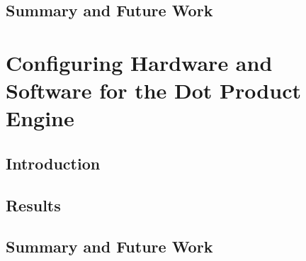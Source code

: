 \subsection{Summary and Future Work}
\label{subsec:FPGAconcl}

\section{Configuring Hardware and Software for the Dot Product Engine}
\label{sec:configDPE}

\subsection{Introduction}
\label{subsec:DPEintro}

\subsection{Results}
\label{subsec:DPEres}

\subsection{Summary and Future Work}
\label{subsec:DPEconcl}
